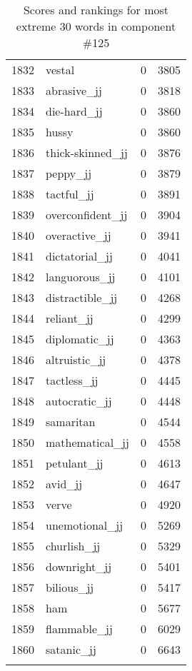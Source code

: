 \begin{longtable}[!htbp]{| rlr@{.}l |}
    1832 & vestal & 0 & 3805 \\
    1833 & abrasive\_jj & 0 & 3818 \\
    1834 & die-hard\_jj & 0 & 3860 \\
    1835 & hussy & 0 & 3860 \\
    1836 & thick-skinned\_jj & 0 & 3876 \\
    1837 & peppy\_jj & 0 & 3879 \\
    1838 & tactful\_jj & 0 & 3891 \\
    1839 & overconfident\_jj & 0 & 3904 \\
    1840 & overactive\_jj & 0 & 3941 \\
    1841 & dictatorial\_jj & 0 & 4041 \\
    1842 & languorous\_jj & 0 & 4101 \\
    1843 & distractible\_jj & 0 & 4268 \\
    1844 & reliant\_jj & 0 & 4299 \\
    1845 & diplomatic\_jj & 0 & 4363 \\
    1846 & altruistic\_jj & 0 & 4378 \\
    1847 & tactless\_jj & 0 & 4445 \\
    1848 & autocratic\_jj & 0 & 4448 \\
    1849 & samaritan & 0 & 4544 \\
    1850 & mathematical\_jj & 0 & 4558 \\
    1851 & petulant\_jj & 0 & 4613 \\
    1852 & avid\_jj & 0 & 4647 \\
    1853 & verve & 0 & 4920 \\
    1854 & unemotional\_jj & 0 & 5269 \\
    1855 & churlish\_jj & 0 & 5329 \\
    1856 & downright\_jj & 0 & 5401 \\
    1857 & bilious\_jj & 0 & 5417 \\
    1858 & ham & 0 & 5677 \\
    1859 & flammable\_jj & 0 & 6029 \\
    1860 & satanic\_jj & 0 & 6643 \\
    \hline
    \caption{Scores and rankings for most extreme 30 words in component \#125} \\
\end{longtable}
